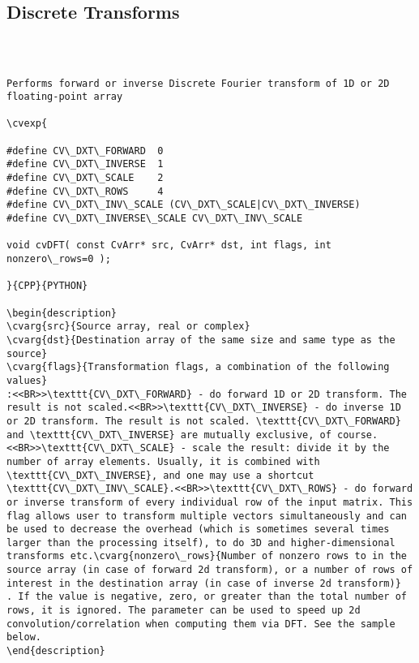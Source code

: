 \subsection{Discrete Transforms}
\begin{verbatim}


\end{verbatim}
\begin{verbatim}

Performs forward or inverse Discrete Fourier transform of 1D or 2D floating-point array

\cvexp{

#define CV\_DXT\_FORWARD  0
#define CV\_DXT\_INVERSE  1
#define CV\_DXT\_SCALE    2
#define CV\_DXT\_ROWS     4
#define CV\_DXT\_INV\_SCALE (CV\_DXT\_SCALE|CV\_DXT\_INVERSE)
#define CV\_DXT\_INVERSE\_SCALE CV\_DXT\_INV\_SCALE

void cvDFT( const CvArr* src, CvArr* dst, int flags, int nonzero\_rows=0 );

}{CPP}{PYTHON}

\begin{description}
\cvarg{src}{Source array, real or complex}
\cvarg{dst}{Destination array of the same size and same type as the source}
\cvarg{flags}{Transformation flags, a combination of the following values}
:<<BR>>\texttt{CV\_DXT\_FORWARD} - do forward 1D or 2D transform. The result is not scaled.<<BR>>\texttt{CV\_DXT\_INVERSE} - do inverse 1D or 2D transform. The result is not scaled. \texttt{CV\_DXT\_FORWARD} and \texttt{CV\_DXT\_INVERSE} are mutually exclusive, of course.<<BR>>\texttt{CV\_DXT\_SCALE} - scale the result: divide it by the number of array elements. Usually, it is combined with \texttt{CV\_DXT\_INVERSE}, and one may use a shortcut \texttt{CV\_DXT\_INV\_SCALE}.<<BR>>\texttt{CV\_DXT\_ROWS} - do forward or inverse transform of every individual row of the input matrix. This flag allows user to transform multiple vectors simultaneously and can be used to decrease the overhead (which is sometimes several times larger than the processing itself), to do 3D and higher-dimensional transforms etc.\cvarg{nonzero\_rows}{Number of nonzero rows to in the source array (in case of forward 2d transform), or a number of rows of interest in the destination array (in case of inverse 2d transform)}
. If the value is negative, zero, or greater than the total number of rows, it is ignored. The parameter can be used to speed up 2d convolution/correlation when computing them via DFT. See the sample below.
\end{description}


\end{verbatim}
